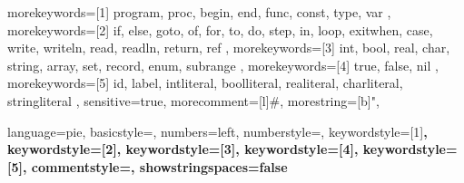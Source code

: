 {
    morekeywords={[1]
        program,
        proc,
        begin,
        end,
        func,
        const,
        type,
        var
    },
    morekeywords={[2]
        if,
        else,
        goto,
        of, %
        for,
        to, %
        do, %
        step, %
        in, %
        loop,
        exitwhen, %
        case,
        write,
        writeln,
        read,
        readln,
        return,
        ref
    },
    morekeywords={[3]
        int,
        bool,
        real,
        char,
        string,
        array,
        set,
        record,
        enum,
        subrange
    },
    morekeywords={[4]
        true, false, nil
    },
    morekeywords={[5]
        id,
        label,
        intliteral,
        boolliteral,
        realiteral,
        charliteral,
        stringliteral
    },
    sensitive=true,
    morecomment=[l]{\#},
    morestring=[b]",
}



{
    language=pie,
    basicstyle=\ttfamily,
    numbers=left,
    numberstyle=\tiny,
    keywordstyle=[1]\bfseries\color{keywordcolor},
    keywordstyle=[2]\bfseries\color{keywordcolor},
    keywordstyle=[3]\bfseries\color{keywordcolor},
    keywordstyle=[4]\bfseries\color{literalcolor},
    keywordstyle=[5]\bfseries\color{todefine},
    commentstyle=\color{commentcolor},
    showstringspaces=false
}

\lstset{style=pie}

%
